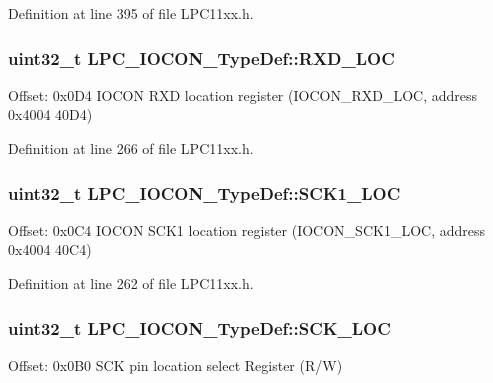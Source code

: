 Definition at line 395 of file L\+P\+C11xx.\+h.

\subsubsection[{\texorpdfstring{R\+X\+D\+\_\+\+L\+OC}{RXD_LOC}}]{ uint32\+\_\+t L\+P\+C\+\_\+\+I\+O\+C\+O\+N\+\_\+\+Type\+Def\+::\+R\+X\+D\+\_\+\+L\+OC}\hypertarget{group___l_p_c11xx___definitions_ga8ec4275fda741de5194ccd27dcb0cb22}{}\label{group___l_p_c11xx___definitions_ga8ec4275fda741de5194ccd27dcb0cb22}
Offset\+: 0x0\+D4 I\+O\+C\+ON R\+XD location register (I\+O\+C\+O\+N\+\_\+\+R\+X\+D\+\_\+\+L\+OC, address 0x4004 40\+D4) 

Definition at line 266 of file L\+P\+C11xx.\+h.

\subsubsection[{\texorpdfstring{S\+C\+K1\+\_\+\+L\+OC}{SCK1_LOC}}]{ uint32\+\_\+t L\+P\+C\+\_\+\+I\+O\+C\+O\+N\+\_\+\+Type\+Def\+::\+S\+C\+K1\+\_\+\+L\+OC}\hypertarget{group___l_p_c11xx___definitions_gad6627c21723c298dedcef119bff3ca6e}{}\label{group___l_p_c11xx___definitions_gad6627c21723c298dedcef119bff3ca6e}
Offset\+: 0x0\+C4 I\+O\+C\+ON S\+C\+K1 location register (I\+O\+C\+O\+N\+\_\+\+S\+C\+K1\+\_\+\+L\+OC, address 0x4004 40\+C4) 

Definition at line 262 of file L\+P\+C11xx.\+h.

\subsubsection[{\texorpdfstring{S\+C\+K\+\_\+\+L\+OC}{SCK_LOC}}]{ uint32\+\_\+t L\+P\+C\+\_\+\+I\+O\+C\+O\+N\+\_\+\+Type\+Def\+::\+S\+C\+K\+\_\+\+L\+OC}\hypertarget{group___l_p_c11xx___definitions_gabee829d0788636cad1cefdfdb9d29fee}{}\label{group___l_p_c11xx___definitions_gabee829d0788636cad1cefdfdb9d29fee}
Offset\+: 0x0\+B0 S\+CK pin location select Register (R/W) 

